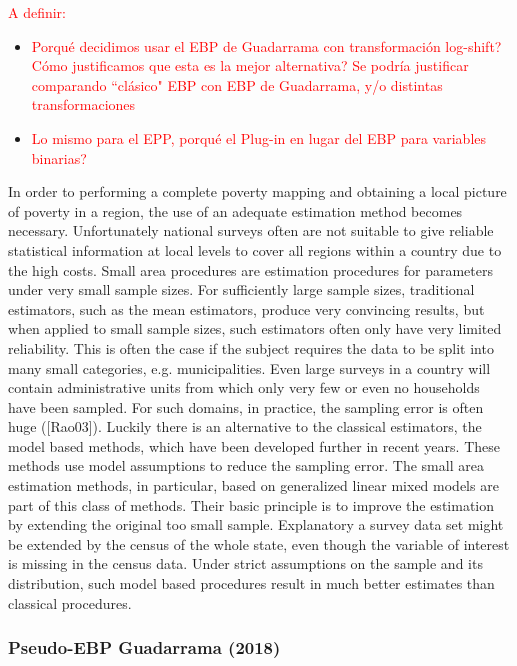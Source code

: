\documentclass[a4paper, 11pt]{article}
\begin{document}
\textcolor{red}{A definir: }
\begin{itemize}
\item \textcolor{red}{Porqué decidimos usar el EBP de Guadarrama con transformación log-shift? Cómo justificamos que esta es la mejor alternativa? Se podría justificar comparando ``clásico" EBP con EBP de Guadarrama, y/o distintas transformaciones }
\item \textcolor{red}{Lo mismo para el EPP, porqué el Plug-in en lugar del EBP para variables binarias?}
\end{itemize}

In order to performing a complete poverty mapping and obtaining a local picture of
poverty in a region, the use of an adequate estimation method becomes necessary.
Unfortunately national surveys often are not suitable to give reliable statistical information
at local levels to cover all regions within a country due to the high costs.
Small area procedures are estimation procedures for parameters under very small
sample sizes. For sufficiently large sample sizes, traditional estimators, such as the
mean estimators, produce very convincing results, but when applied to small sample
sizes, such estimators often only have very limited reliability. This is often the case
if the subject requires the data to be split into many small categories, e.g. municipalities.
Even large surveys in a country will contain administrative units from
which only very few or even no households have been sampled. For such domains, in
practice, the sampling error is often huge ([Rao03]). Luckily there is an alternative
to the classical estimators, the model based methods, which have been developed
further in recent years. These methods use model assumptions to reduce the sampling
error. The small area estimation methods, in particular, based on generalized
linear mixed models are part of this class of methods. Their basic principle is to
improve the estimation by extending the original too small sample. Explanatory a
survey data set might be extended by the census of the whole state, even though
the variable of interest is missing in the census data. Under strict assumptions on the sample and its distribution, such model based procedures result
in much better estimates than classical procedures.
    
\subsubsection{Pseudo-EBP Guadarrama (2018)}
\end{document}
